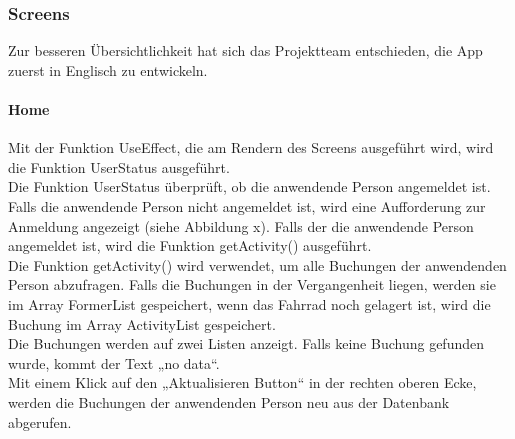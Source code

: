 \subsubsection{Screens}Zur besseren Übersichtlichkeit hat sich das Projektteam entschieden, die App zuerst in Englisch zu entwickeln.\\

\paragraph{Home}Mit der Funktion UseEffect, die am Rendern des Screens ausgeführt wird, wird die Funktion UserStatus ausgeführt.\\
Die Funktion UserStatus überprüft, ob die anwendende Person angemeldet ist. Falls die anwendende Person nicht angemeldet ist, wird eine Aufforderung zur Anmeldung angezeigt (siehe Abbildung x). Falls der die anwendende Person angemeldet ist, wird die Funktion getActivity() ausgeführt. \\
Die Funktion getActivity() wird verwendet, um alle Buchungen der anwendenden Person abzufragen. Falls die Buchungen in der Vergangenheit liegen, werden sie im Array FormerList gespeichert, wenn das Fahrrad noch gelagert ist, wird die Buchung im Array ActivityList gespeichert. \\
Die Buchungen werden auf zwei Listen anzeigt. Falls keine Buchung gefunden wurde, kommt der Text „no data“. \\
Mit einem Klick auf den „Aktualisieren Button“ in der rechten oberen Ecke, werden die Buchungen der anwendenden Person neu aus der Datenbank abgerufen.\\

